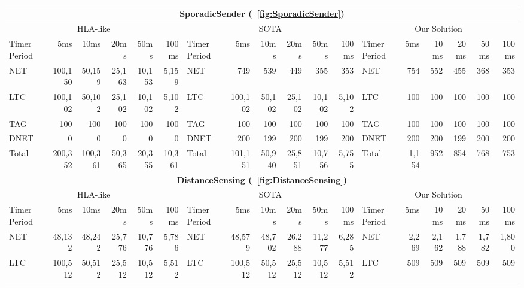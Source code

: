 \begin{table*}
\scriptsize
	\centering
	\begin{tabular}{|l|rrrrr||l|rrrrr||l|rrrrr|}
		\hline
		\multicolumn{18}{|c|}{\textbf{SporadicSender (\figurename~\ref{fig:SporadicSender})}} \\
		\hline
		\multicolumn{6}{|c||}{HLA-like} & \multicolumn{6}{|c||}{SOTA} & \multicolumn{6}{|c|}{Our Solution} \\
		\hline
		Timer Period \hspace{-5pt} & 5ms & 10ms & 20ms & 50ms & 100ms & Timer Period \hspace{-5pt} & 5ms & 10ms & 20ms & 50ms & 100ms & Timer Period \hspace{-5pt} & 5ms & 10ms & 20ms & 50ms & 100ms \\
		\hline
		NET & 100,150 & 50,159 & 25,163 & 10,153 & 5,159 & NET & 749 & 539 & 449 & 355 & 353 & NET & 754 & 552 & 455 & 368 & 353 \\
		LTC & 100,102 & 50,102 & 25,102 & 10,102 & 5,102 & LTC & 100,102 & 50,102 & 25,102 & 10,102 & 5,102 & LTC & 100 & 100 & 100 & 100 & 100 \\
		TAG & 100 & 100 & 100 & 100 & 100 & TAG & 100 & 100 & 100 & 100 & 100 & TAG & 100 & 100 & 100 & 100 & 100 \\
		DNET & 0 & 0 & 0 & 0 & 0 & DNET & 200 & 199 & 200 & 199 & 200 & DNET & 200 & 200 & 199 & 200 & 200 \\
		\hline
		Total & 200,352 & 100,361 & 50,365 & 20,355 & 10,361 & Total & 101,151 & 50,940 & 25,851 & 10,756 & 5,755 & Total & 1,154 & 952 & 854 & 768 & 753 \\
		\hline
%
		\hline
		\hline
		\multicolumn{18}{|c|}{\textbf{DistanceSensing (\figurename~\ref{fig:DistanceSensing})}} \\
		\hline
		\multicolumn{6}{|c||}{HLA-like} & \multicolumn{6}{|c||}{SOTA} & \multicolumn{6}{|c|}{Our Solution} \\
		\hline
		Timer Period \hspace{-5pt} & 5ms & 10ms & 20ms & 50ms & 100ms & Timer Period \hspace{-5pt} & 5ms & 10ms & 20ms & 50ms & 100ms & Timer Period \hspace{-5pt} & 5ms & 10ms & 20ms & 50ms & 100ms \\
		\hline
		NET & 48,132 & 48,242 & 25,776 & 10,776 & 5,786 & NET & 48,579 & 48,702 & 26,288 & 11,277 & 6,285 & NET & 2,269 & 2,162 & 1,788 & 1,782 & 1,800 \\
		LTC & 100,512 & 50,512 & 25,512 & 10,512 & 5,512 & LTC & 100,512 & 50,512 & 25,512 & 10,512 & 5,512 & LTC & 509 & 509 & 509 & 509 & 509 \\

\end{tabular}
\end{table*}
